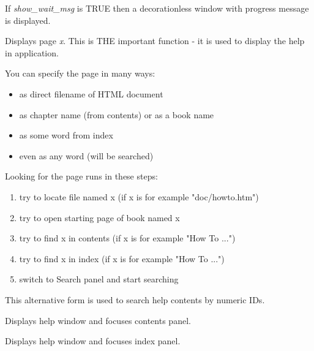If {\it show\_wait\_msg} is TRUE then a decorationless window with progress message is displayed.

\label{wxhtmlhelpcontrollerdisplay}


Displays page {\it x}. This is THE important function - it is used to display
the help in application.

You can specify the page in many ways:

\begin{itemize}\itemsep=0pt
\item as direct filename of HTML document
\item as chapter name (from contents) or as a book name
\item as some word from index
\item even as any word (will be searched) 
\end{itemize}

Looking for the page runs in these steps:

\begin{enumerate}\itemsep=0pt
\item try to locate file named x (if x is for example "doc/howto.htm")
\item try to open starting page of book named x
\item try to find x in contents (if x is for example "How To ...")
\item try to find x in index (if x is for example "How To ...")
\item switch to Search panel and start searching
\end{enumerate}


This alternative form is used to search help contents by numeric IDs.

\label{wxhtmlhelpcontrollerdisplaycontents}


Displays help window and focuses contents panel.

\label{wxhtmlhelpcontrollerdisplayindex}


Displays help window and focuses index panel.

